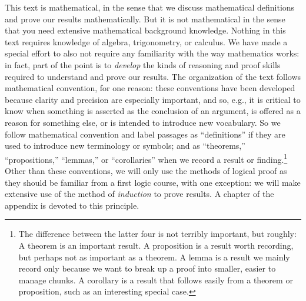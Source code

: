This text is mathematical, in the sense that we discuss mathematical
definitions and prove our results mathematically. But it is not
mathematical in the sense that you need extensive mathematical
background knowledge. Nothing in this text requires
knowledge of algebra, trigonometry, or calculus. We have made a
special effort to also not require any familiarity with the way
mathematics works: in fact, part of the point is to \emph{develop} the
kinds of reasoning and proof skills required to understand and prove
our results. The organization of the text follows mathematical
convention, for one reason: these conventions have been developed
because clarity and precision are especially important, and so, e.g.,
it is critical to know when something is asserted as the conclusion of
an argument, is offered as a reason for something else, or is intended
to introduce new vocabulary. So we follow mathematical convention and
label passages as ``definitions'' if they are used to introduce new
terminology or symbols; and as ``theorems,'' ``propositions,''
``lemmas,'' or ``corollaries'' when we record a result or
finding.\footnote{The difference between the latter four is not
  terribly important, but roughly: A theorem is an important result. A
  proposition is a result worth recording, but perhaps not as
  important as a theorem. A lemma is a result we mainly record only
  because we want to break up a proof into smaller, easier to manage
  chunks. A corollary is a result that follows easily from a theorem
  or proposition, such as an interesting special case.}  Other than
these conventions, we will only use the methods of logical proof as
they should be familiar from a first logic course, with one exception:
we will make extensive use of the method of \emph{induction} to prove
results. A chapter of the appendix is devoted to this principle.

